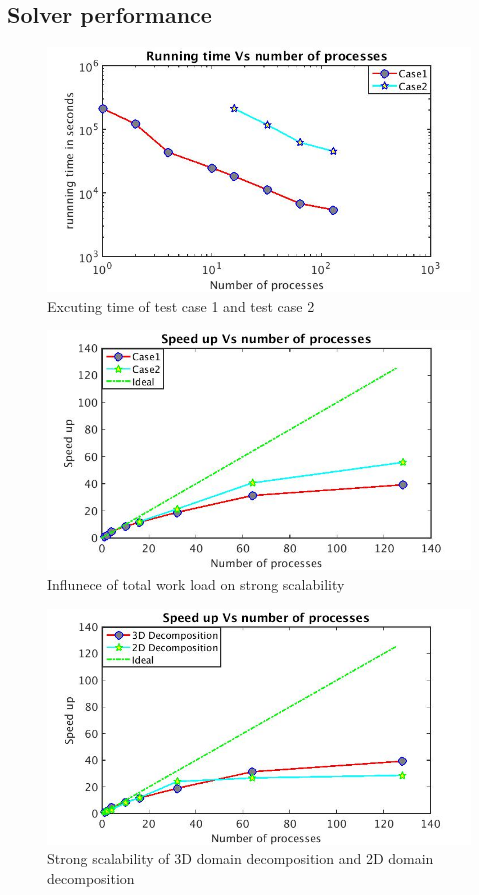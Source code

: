 \documentclass[conference,compsoc]{IEEEtran}
\begin{document}
\subsection{Solver performance}
\begin{figure}[!t]
\centering
\includegraphics[scale=0.33]{2cases_time}
\caption{Excuting time of test case 1 and test case 2}
\label{fig:2cases_time}
\end{figure}
%
\begin{figure}[!t]
\centering
\includegraphics[scale=0.33]{2cases_efficiency}
\caption{Influnece of total work load on strong scalability}
\label{fig:2cases_efficiency}
\end{figure}
%
\begin{figure}[!t]
\centering
\includegraphics[scale=0.33]{2D_vs_3D_efficiency}
\caption{Strong scalability of 3D domain decomposition and 2D domain decomposition}
\label{fig:2D_vs_3D_efficiency}
\end{figure}
\end{document}
